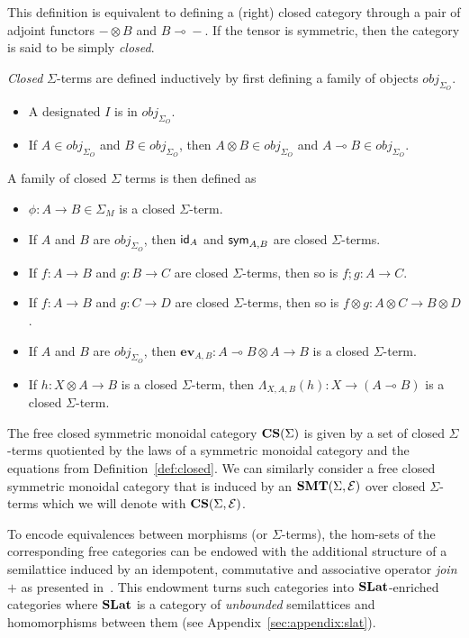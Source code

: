 This definition is equivalent to defining a (right) closed category through a pair of adjoint functors $- \otimes B$ and $B \multimap{} -$.
If the tensor is symmetric, then the category is said to be simply \textit{closed}.

\begin{definition}
	\textit{Closed} $\Sigma$-terms are defined inductively by first defining a family of objects $obj_{\Sigma_{O}}$.
	\begin{itemize}
		\item A designated $I$ is in $obj_{\Sigma_{O}}$.
		\item If $A \in obj_{\Sigma_{O}}$ and $B \in obj_{\Sigma_{O}}$, then $A \otimes B \in obj_{\Sigma_{O}}$ and $A \multimap B \in obj_{\Sigma_{O}}$.
	\end{itemize}
	A family of closed $\Sigma$ terms is then defined as
	\begin{itemize}
		\item $\phi : A \to B \in \Sigma_{M}$ is a closed $\Sigma$-term.
		\item If $A$ and $B$ are $obj_{\Sigma_{O}}$, then $\textsf{id}_{A}$ and $\textsf{sym}_{A,B}$ are closed $\Sigma$-terms.
		\item If $f : A \to B$ and $g : B \to C$ are closed $\Sigma$-terms, then so is $f;g : A \to C$.
		\item If $f : A \to B$ and $g : C \to D$ are closed $\Sigma$-terms, then so is $f \otimes g : A \otimes C \to B \otimes D$.
		\item If $A$ and $B$ are $obj_{\Sigma_{O}}$, then $\textbf{ev}_{A,B} : A \multimap B \otimes A \to B$ is a closed $\Sigma$-term.
		\item If $h : X \otimes A \to B$ is a closed $\Sigma$-term, then $\Lambda_{X,A,B}(h) : X \to (A \multimap B)$ is a closed $\Sigma$-term.
	\end{itemize}
\end{definition}

\begin{definition}
	The free closed symmetric monoidal category $\mathbf{CS}(\Sigma)$ is given by a set of closed $\Sigma$-terms quotiented by the laws of a symmetric monoidal category and the equations from Definition~\ref{def:closed}.
	We can similarly consider a free closed symmetric monoidal category that is induced by an $\mathbf{SMT}(\Sigma, \mathcal{E})$ over closed $\Sigma$-terms which we will denote with $\mathbf{CS}(\Sigma, \mathcal{E})$.
\end{definition}

To encode equivalences between morphisms (or $\Sigma$-terms), the hom-sets of the corresponding free categories can be endowed with the additional structure of a semilattice induced by an idempotent, commutative and associative operator \textit{join} $+$ as presented in~\cite{ghica2024equivalencehypergraphsegraphsmonoidal}.
This endowment turns such categories into $\mathbf{SLat}$-enriched categories where $\mathbf{SLat}$ is a category of \textit{unbounded} semilattices and homomorphisms between them (see Appendix~\ref{sec:appendix:slat}).

